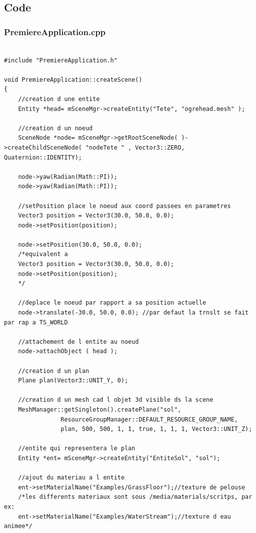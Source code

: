 \subsection{Code}

\subsubsection{PremiereApplication.cpp}
\begin{lstlisting}[caption={PremiereApplication.cpp: Cr\'eation de la cam\'era}]

#include "PremiereApplication.h"

void PremiereApplication::createScene()
{
    //creation d une entite
    Entity *head= mSceneMgr->createEntity("Tete", "ogrehead.mesh" );
    
    //creation d un noeud
    SceneNode *node= mSceneMgr->getRootSceneNode( )->createChildSceneNode( "nodeTete " , Vector3::ZERO, Quaternion::IDENTITY);
    
    node->yaw(Radian(Math::PI));
    node->yaw(Radian(Math::PI));

    //setPosition place le noeud aux coord passees en parametres
    Vector3 position = Vector3(30.0, 50.0, 0.0);
    node->setPosition(position);

    node->setPosition(30.0, 50.0, 0.0); 
    /*equivalent a
    Vector3 position = Vector3(30.0, 50.0, 0.0);
    node->setPosition(position);
    */

    //deplace le noeud par rapport a sa position actuelle
    node->translate(-30.0, 50.0, 0.0); //par defaut la trnslt se fait par rap a TS_WORLD
   
    //attachement de l entite au noeud
    node->attachObject ( head );

    //creation d un plan
    Plane plan(Vector3::UNIT_Y, 0);

    //creation d un mesh cad l objet 3d visible ds la scene
    MeshManager::getSingleton().createPlane("sol",
                ResourceGroupManager::DEFAULT_RESOURCE_GROUP_NAME,
                plan, 500, 500, 1, 1, true, 1, 1, 1, Vector3::UNIT_Z); 

    //entite qui representera le plan
    Entity *ent= mSceneMgr->createEntity("EntiteSol", "sol");

    //ajout du materiau a l entite
    ent->setMaterialName("Examples/GrassFloor");//texture de pelouse
    /*les differents materiaux sont sous /media/materials/scritps, par ex:
    ent->setMaterialName("Examples/WaterStream");//texture d eau animee*/


\end{lstlisting}
